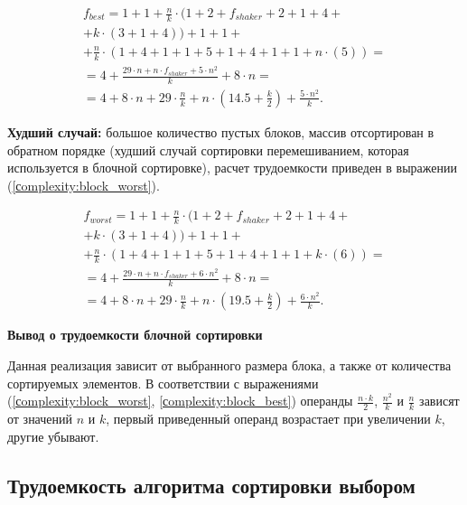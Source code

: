 \begin{equation}
	\label{сomplexity:block_best}
	\begin{gathered}
		f_{best} = 1 +1 + \frac{n}{k} \cdot(1 + 2+f_{shaker} + 2 + 1 + 4 + \\
		+ k \cdot (3 + 1 + 4)) + 1 + 1 + \\
		+ \frac{n}{k} \cdot (1 + 4 + 1 + 1 + 5 + 1 + 4 + 1 + 1 + n \cdot (5)) = \\
		= 4 + \frac{29\cdot n + n \cdot f_{shaker} + 5 \cdot n^2}{k}  + 8 \cdot n  = \\
		= 4 + 8 \cdot n + 29 \cdot \frac{n}{k} + n \cdot (14.5 + \frac{k}{2}) + \frac{5 \cdot n^2}{k}.
	\end{gathered}
\end{equation}

\textbf{Худший случай:} большое количество пустых блоков, массив отсортирован в обратном порядке (худший случай сортировки перемешиванием, которая используется в блочной сортировке), расчет трудоемкости приведен в выражении (\ref{сomplexity:block_worst}).

\begin{equation}
	\label{сomplexity:block_worst}
	\begin{gathered}
		f_{worst} = 1 +1 + \frac{n}{k} \cdot(1 + 2+f_{shaker} + 2 + 1 + 4 + \\
		+ k \cdot (3 + 1 + 4)) + 1 + 1 + \\
		+ \frac{n}{k} \cdot (1 + 4 + 1 + 1 + 5 + 1 + 4 + 1 + 1 + k \cdot (6)) = \\
		= 4 + \frac{29\cdot n + n \cdot f_{shaker} + 6 \cdot n^2}{k}  + 8 \cdot n  = \\
		= 4 + 8 \cdot n + 29 \cdot \frac{n}{k} + n \cdot (19.5 + \frac{k}{2}) + \frac{6 \cdot n^2}{k}.
	\end{gathered}
\end{equation}


\textbf{Вывод о трудоемкости блочной сортировки}

Данная реализация зависит от выбранного размера блока, а также от количества сортируемых элементов. В соответствии с выражениями (\ref{сomplexity:block_worst}, \ref{сomplexity:block_best})  операнды $\frac{n \cdot k}{2}$, $\frac{n^2}{k}$ и $\frac{n}{k}$ зависят от значений $n$ и $k$, первый приведенный операнд возрастает при увеличении $k$, другие убывают.


\subsection{Трудоемкость алгоритма сортировки выбором}

